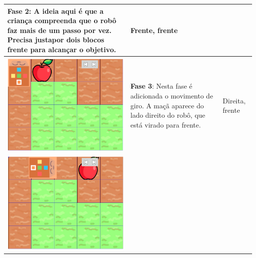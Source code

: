 \begin{quadro}[htbp]
\begin{longtable}{ | m{} | m{} | m{} | }
        \textbf{Fase 2}: 
        A ideia aqui é que a criança compreenda que o robô faz mais de um passo por vez. Precisa justapor dois blocos frente para alcançar o objetivo. & 
        
        Frente, frente

        \\ \hline
    
    
        \includegraphics[width=.9\linewidth]{figs/prog/3.png} &
    
        \textbf{Fase 3}: 
        Nesta fase é adicionada o movimento de giro. A maçã aparece do lado direito do robô, que está virado para frente. &

        Direita, frente
        
        \\ \hline
    
    
        \includegraphics[width=.9\linewidth]{figs/prog/4.png} &
    

\end{longtable}
\end{quadro}
